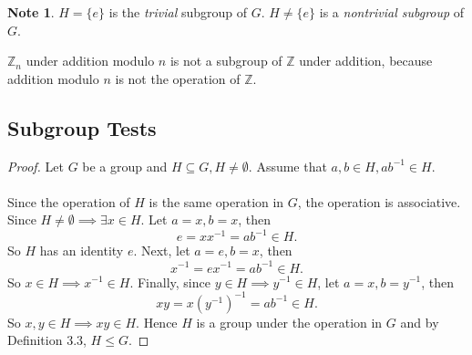 \documentclass{article}
\newtheorem{theorem}{Theorem}[section]
\theoremstyle{definition}
\newtheorem{note}{Note}[section]
\begin{document}
\begin{note}
   $H =\{e\}$ is the \textit{trivial} subgroup of $G$. $H \neq \{e\}$ is a \textit{nontrivial subgroup} of $G$.
   
   $\mathbb{Z}_n$ under addition modulo $n$ is not a subgroup of $\mathbb{Z}$ under addition, because addition modulo $n$ is not the operation of $\mathbb{Z}$.
\end{note}

\subsection{Subgroup Tests}

\begin{proof}
    Let $G$ be a group and $H \subseteq G, H \neq \emptyset$. Assume that $a,b \in H, ab^{-1} \in H$. 
    \\ \\
    Since the operation of $H$ is the same operation in $G$, the operation is associative. Since $H \neq \emptyset \implies \exists x \in H$. Let $a=x,b=x$, then
    \begin{equation*}
        e = xx^{-1} = ab^{-1} \in H.
    \end{equation*}
    So $H$ has an identity $e$. Next, let $a=e,b=x$, then
    \begin{equation*}
        x^{-1} = ex^{-1} = ab^{-1} \in H.
    \end{equation*}
    So $x \in H \implies x^{-1} \in H$. Finally, since $y \in H \implies y^{-1} \in H$, let $a=x,b=y^{-1}$, then
    \begin{equation*}
        xy = x(y^{-1})^{-1} = ab^{-1} \in H.
    \end{equation*}
    So $x,y \in H \implies xy \in H$. Hence $H$ is a group under the operation in $G$ and by Definition 3.3, $H \leq G$.
    \end{proof}
    
\end{document}
